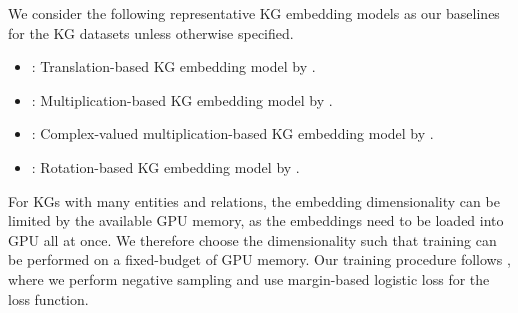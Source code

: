 We consider the following representative KG embedding models as our baselines for the KG datasets unless otherwise specified.
\begin{itemize}
  \setlength{\parskip}{0cm}
  \setlength{\itemsep}{0cm}
    \item : Translation-based KG embedding model by \citet{bordes2013translating}. 
    \item : Multiplication-based KG embedding model by \citet{yang2014embedding}.
    \item : Complex-valued multiplication-based KG embedding model by \citet{trouillon2016complex}.
    \item : Rotation-based KG embedding model by \citet{sun2019rotate}.
\end{itemize}
For KGs with many entities and relations, the embedding dimensionality can be limited by the available GPU memory, as the embeddings need to be loaded into GPU all at once. We therefore choose the dimensionality such that training can be performed on a fixed-budget of GPU memory.
Our training procedure follows \citet{sun2019rotate}, where we perform negative sampling and use margin-based logistic loss for the loss function.

